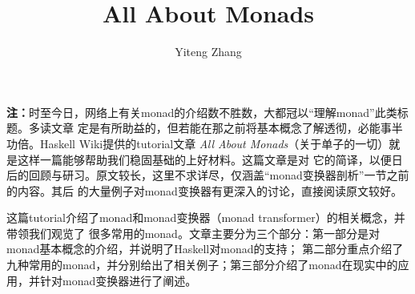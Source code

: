 \documentclass[12pt]{article}
\title{All About Monads}
\author{Yiteng Zhang}
\begin{document}
\maketitle

\noindent{}\textbf{注：}时至今日，网络上有关monad的介绍数不胜数，大都冠以“理解monad”此类标题。多读文章
定是有所助益的，但若能在那之前将基本概念了解透彻，必能事半功倍。Haskell Wiki提供的tutorial文章
\textit{All About Monads}（关于单子的一切）就是这样一篇能够帮助我们稳固基础的上好材料。这篇文章是对
它的简译，以便日后的回顾与研习。原文较长，这里不求详尽，仅涵盖“monad变换器剖析”一节之前的内容。其后
的大量例子对monad变换器有更深入的讨论，直接阅读原文较好。

\vspace{0.5em}
\noindent{}这篇tutorial介绍了monad和monad变换器（monad transformer）的相关概念，并带领我们观览了
很多常用的monad。文章主要分为三个部分：第一部分是对monad基本概念的介绍，并说明了Haskell对monad的支持；
第二部分重点介绍了九种常用的monad，并分别给出了相关例子；第三部分介绍了monad在现实中的应用，并针对monad变换器进行了阐述。

\vspace{-0.5em}

\clearpage


\clearpage


\end{document}
